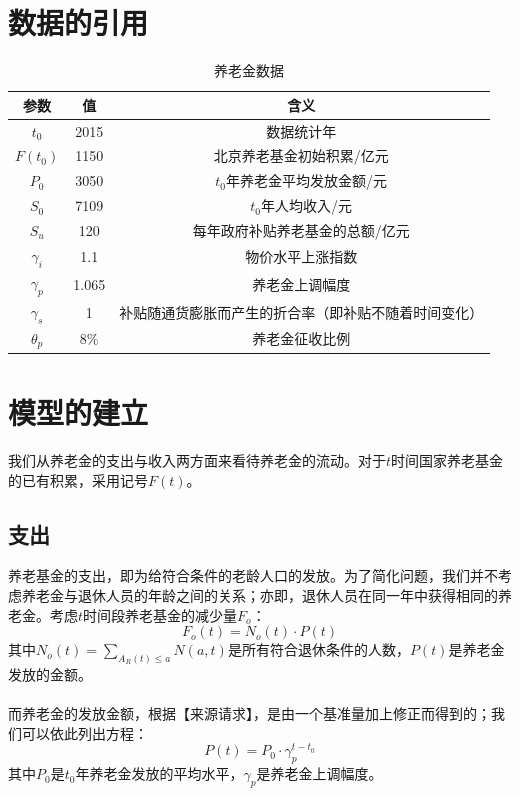 \documentclass[a4paper]{article}
\begin{document}
\section{数据的引用}
		\begin{table}[H]
		\centering
		\caption{养老金数据}
		\label{pension_data}
		\begin{tabular}{ccc}
			\hline
			参数				&	值			&	含义 \\
			\hline
			$t_0$				&	2015		& 数据统计年	\\
			$F(t_0)$			&	1150		&	北京养老基金初始积累/亿元	\\
			$P_0$				&	3050		&	$t_0$年养老金平均发放金额/元	\\
			$S_0$				&	7109		&	$t_0$年人均收入/元	\\
			$S_u$				&	120			&	每年政府补贴养老基金的总额/亿元	\\
			$\gamma_i$	&	1.1			&	物价水平上涨指数	\\
			$\gamma_p$	&	1.065		&	养老金上调幅度	\\
			$\gamma_s$	&	1				&	补贴随通货膨胀而产生的折合率（即补贴不随着时间变化）	\\
			$\theta_p$	&	8\%			&	养老金征收比例	\\
			\hline
		\end{tabular}
	\end{table}
\section{模型的建立}
我们从养老金的支出与收入两方面来看待养老金的流动。对于$t$时间国家养老基金的已有积累，采用记号$F(t)$。
\subsection{支出}
养老基金的支出，即为给符合条件的老龄人口的发放。为了简化问题，我们并不考虑养老金与退休人员的年龄之间的关系；亦即，退休人员在同一年中获得相同的养老金。考虑$t$时间段养老基金的减少量$F_o$：
	\begin{equation}
		\label{pension_out}
		F_o(t) = N_o(t) \cdot P(t)
	\end{equation}
其中$N_o(t)=\sum_{A_R(t) \leq a} N(a,t)$是所有符合退休条件的人数，$P(t)$是养老金发放的金额。\\\\
\indent
而养老金的发放金额，根据【来源请求】，是由一个基准量加上修正而得到的；我们可以依此列出方程：
	\begin{equation}
		\label{pension_per_out}
		P(t) =  P_0 \cdot \gamma_p^{t-t_0}
	\end{equation}
其中$P_0$是$t_0$年养老金发放的平均水平，$\gamma_p$是养老金上调幅度。
\end{document}
